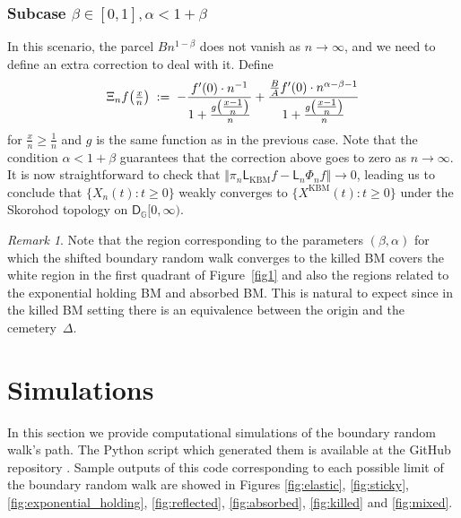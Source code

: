 \documentclass[12pt,a4paper]{article}
\theoremstyle{plain}
\theoremstyle{remark}
\newtheorem{remark}[theorem]{Remark}
\newcommand{\msf}[1]{{\mathsf #1}}
\newcommand{\bb}[1]{{\mathbb #1}}
\newcommand{\pfrac}[2]{\genfrac{}{}{}{1}{#1}{#2}}
\newcommand{\pn}[1]{\big(\pfrac{#1}{n}\big)}
\begin{document}
	\subsubsection{Subcase \texorpdfstring{$\beta\in [0,1], \alpha < 1+\beta$}{0=< beta =< 1, alpha < 1+beta}}
	In this scenario, the parcel $Bn^{1-\beta}$ does not vanish as $n\to\infty$, and we need to define an extra correction to deal with it.
	Define
	\begin{align*}
		\Xi_nf\pn{x}\;:=\; -\frac{f'(0)\cdot n^{-1}}{1+\frac{g\pn{x-1}}{n}} +
		\frac{\frac{B}{A}f'(0)\cdot n^{\alpha-\beta-1}}{1+\frac{g\pn{x-1}}{n}}
	\end{align*}
	for $\frac{x}{n} \geq \frac{1}{n}$ and $g$  is the same function as in the previous case. Note that the  condition $\alpha<1+\beta$ guarantees that the correction above goes to zero as $n\to\infty$.  It is now straightforward to check that  $	\Vert  \pi_n \msf{L}_{\text{KBM}}f-\msf{L}_n\Phi_nf \Vert \to 0$, leading us to conclude that $\{X_{n}(t): t \geq 0\}$ weakly converges to $\{X^{\text{KBM}}(t): t\geq 0\}$ under the Skorohod topology on $\msf{D}_\bb{G}[0,\infty)$.
	\begin{remark}\rm
		Note that the region corresponding to the parameters $(\beta,\alpha)$ for which the shifted boundary random walk converges to the killed BM covers
		the white region in the first quadrant of Figure~\ref{fig1} and also the regions related to the exponential holding BM and absorbed BM. This is natural to expect since in the killed BM setting there is an equivalence between the origin and the cemetery~$\Delta$.
	\end{remark}
	
	\section{Simulations}\label{s4}
	In this section we provide computational simulations of the boundary random walk's path. The Python script which generated them is available  at the GitHub repository \cite{BRW}. Sample outputs of this code  corresponding to each possible limit of the boundary random walk are showed in Figures \ref{fig:elastic}, \ref{fig:sticky},  \ref{fig:exponential_holding},  \ref{fig:reflected}, \ref{fig:absorbed}, \ref{fig:killed}  and  \ref{fig:mixed}.
	
	\newcommand{\constante}{0.45}
	
\end{document}
